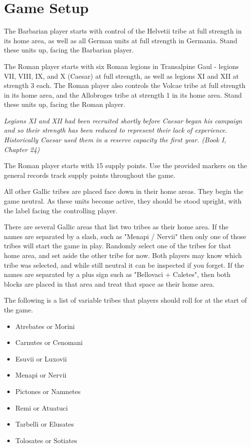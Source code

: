 \section{Game Setup}

The Barbarian player starts with control of the Helvetii tribe at full strength in its home area, as well as all German units at full strength in Germania. Stand these units up, facing the Barbarian player.

The Roman player starts with six Roman legions in Transalpine Gaul - legions VII, VIII, IX, and X (Caesar) at full strength, as well as legions XI and XII at strength 3 each. The Roman player also controls the Volcae tribe at full strength in its home area, and the Allobroges tribe at strength 1 in its home area. Stand these units up, facing the Roman player.

\textit{Legions XI and XII had been recruited shortly before Caesar began his campaign and so their strength has been reduced to represent their lack of experience. Historically Caesar used them in a reserve capacity the first year. (Book I, Chapter 24)}

The Roman player starts with 15 supply points. Use the provided markers on the general records track supply points throughout the game.

All other Gallic tribes are placed face down in their home areas. They begin the game neutral. As these units become active, they should be stood upright, with the label facing the controlling player.

There are several Gallic areas that list two tribes as their home area. If the names are separated by a slash, such as "Menapi / Nervii" then only one of those tribes will start the game in play. Randomly select one of the tribes for that home area, and set aside the other tribe for now. Both players may know which tribe was selected, and while still neutral it can be inspected if you forget. If the names are separated by a plus sign such as "Bellovaci + Caletes", then both blocks are placed in that area and treat that space as their home area.

The following is a list of variable tribes that players should roll for at the start of the game.

\begin{itemize}[nosep]
  \item Atrebates or Morini
  \item Carnutes or Cenomani
  \item Esuvii or Luxovii
  \item Menapi or Nervii
  \item Pictones or Namnetes
  \item Remi or Atuatuci
  \item Tarbelli or Elusates
  \item Tolosates or Sotiates
\end{itemize}